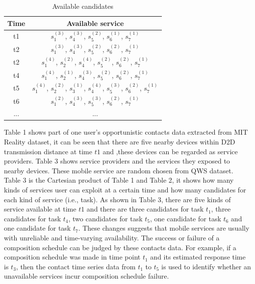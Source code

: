 \documentclass[journal]{IEEEtran}
\begin{document}
\begin{table}[!t]
\renewcommand{\arraystretch}{1.8}
\caption{Available candidates}
\label{Available candidates}
\centering
\begin{tabular}{c c}
\hline
\bfseries Time & \bfseries Available service\\
\hline
t1     & $s_1^{(3)}$, $s_4^{(3)}$, $s_5^{(2)}$, $s_6^{(1)}$, $s_7^{(1)}$ \\
t2     & $s_1^{(3)}$, $s_4^{(3)}$, $s_5^{(2)}$, $s_6^{(2)}$, $s_7^{(1)}$ \\
t2     & $s_1^{(4)}$, $s_2^{(2)}$, $s_4^{(4)}$, $s_5^{(2)}$, $s_6^{(2)}$, $s_7^{(1)}$ \\
t4     & $s_1^{(4)}$, $s_2^{(1)}$, $s_4^{(3)}$, $s_5^{(2)}$, $s_6^{(2)}$, $s_7^{(1)}$ \\
t5     & $s_1^{(4)}$, $s_2^{(2)}$, $s_3^{(1)}$, $s_4^{(4)}$, $s_5^{(3)}$, $s_6^{(2)}$, $s_7^{(1)}$ \\
t6     & $s_1^{(2)}$, $s_4^{(3)}$, $s_5^{(3)}$, $s_6^{(2)}$, $s_7^{(1)}$ \\
... & ...\\
\hline
\end{tabular}
\end{table}

Table 1 shows part of one user's opportunistic contacts data extracted from MIT Reality dataset, it can be seen that there are five nearby devices within D2D transmission distance at time $t1$ and ,these devices can be regarded as service providers. Table 3 shows service providers and the services they exposed to nearby devices. These mobile service are random chosen from QWS dataset. Table 3 is the Cartesian product of Table 1 and Table 2, it shows how many kinds of services user can exploit at a certain time and how many candidates for each kind of service (i.e., task). As shown in Table 3, there are five kinds of service available at time $t1$ and there are three candidates for task $t_1$, three candidates for task $t_4$, two candidates for task $t_5$, one candidate for task $t_6$ and one candidate for task $t_7$. These changes suggests that mobile services are usually with unreliable and time-varying availability.
The success or failure of a composition schedule can be judged by these contacts data. For example, if a composition schedule was made in time point $t_1$ and its estimated response time is $t_3$, then the contact time series data from $t_1$ to $t_5$ is used to identify whether an unavailable services incur composition schedule failure.
\end{document}
